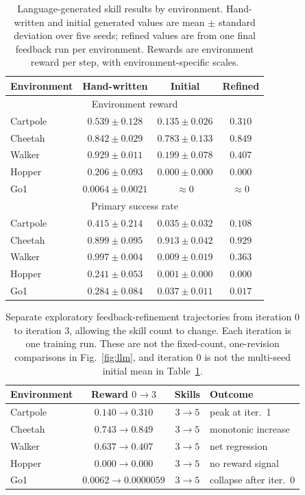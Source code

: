 \documentclass[conference,letterpaper,10pt]{IEEEtran}
\begin{document}
\begin{table}[!t]
\caption{Language-generated skill results by environment. Hand-written and initial generated values are mean $\pm$ standard deviation over five seeds; refined values are from one final feedback run per environment. Rewards are environment reward per step, with environment-specific scales.}
\label{tab:llmmain}
\centering
\footnotesize
\setlength{\tabcolsep}{3pt}
\begin{tabular}{@{}lccc@{}}
\toprule
Environment & Hand-written & Initial & Refined\\
\midrule
\multicolumn{4}{c}{Environment reward}\\
\midrule
Cartpole & $0.539\pm0.128$ & $0.135\pm0.026$ & $0.310$\\
Cheetah & $0.842\pm0.029$ & $0.783\pm0.133$ & $0.849$\\
Walker & $0.929\pm0.011$ & $0.199\pm0.078$ & $0.407$\\
Hopper & $0.206\pm0.093$ & $0.000\pm0.000$ & $0.000$\\
Go1 & $0.0064\pm0.0021$ & $\approx0$ & $\approx0$\\
\midrule
\multicolumn{4}{c}{Primary success rate}\\
\midrule
Cartpole & $0.415\pm0.214$ & $0.035\pm0.032$ & $0.108$\\
Cheetah & $0.899\pm0.095$ & $0.913\pm0.042$ & $0.929$\\
Walker & $0.997\pm0.004$ & $0.009\pm0.019$ & $0.363$\\
Hopper & $0.241\pm0.053$ & $0.001\pm0.000$ & $0.000$\\
Go1 & $0.284\pm0.084$ & $0.037\pm0.011$ & $0.017$\\
\bottomrule
\end{tabular}
\end{table}


\begin{table}[!t]
\caption{Separate exploratory feedback-refinement trajectories from iteration 0 to iteration 3, allowing the skill count to change. Each iteration is one training run. These are not the fixed-count, one-revision comparisons in Fig.~\ref{fig:llm}, and iteration 0 is not the multi-seed initial mean in Table~\ref{tab:llmmain}.}
\label{tab:refineoutcome}
\centering
\footnotesize
\setlength{\tabcolsep}{4pt}
\begin{tabular}{@{}lccl@{}}
\toprule
Environment & Reward $0\rightarrow3$ & Skills & Outcome\\
\midrule
Cartpole & $0.140\rightarrow0.310$ & $3\rightarrow5$ & peak at iter.~1\\
Cheetah & $0.743\rightarrow0.849$ & $3\rightarrow5$ & monotonic increase\\
Walker & $0.637\rightarrow0.407$ & $3\rightarrow5$ & net regression\\
Hopper & $0.000\rightarrow0.000$ & $3\rightarrow5$ & no reward signal\\
Go1 & $0.0062\rightarrow0.0000059$ & $3\rightarrow5$ & collapse after iter.~0\\
\bottomrule
\end{tabular}
\end{table}
\end{document}
